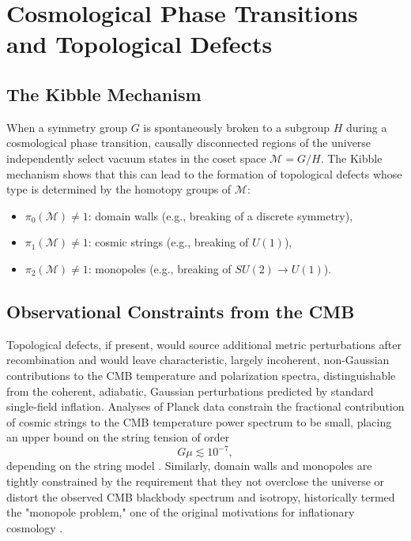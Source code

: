 \documentclass[11pt]{article}
\begin{document}
\section{Cosmological Phase Transitions and Topological Defects}

\subsection{The Kibble Mechanism}

When a symmetry group $G$ is spontaneously broken to a subgroup $H$ during a cosmological phase transition, causally disconnected regions of the universe independently select vacuum states in the coset space $\mathcal{M} = G/H$. The Kibble mechanism \citep{Kibble1976} shows that this can lead to the formation of topological defects whose type is determined by the homotopy groups of $\mathcal{M}$:
\begin{itemize}
\item $\pi_0(\mathcal{M}) \neq 1$: domain walls (e.g., breaking of a discrete symmetry),
\item $\pi_1(\mathcal{M}) \neq 1$: cosmic strings (e.g., breaking of $U(1)$),
\item $\pi_2(\mathcal{M}) \neq 1$: monopoles (e.g., breaking of $SU(2) \to U(1)$).
\end{itemize}

\subsection{Observational Constraints from the CMB}

Topological defects, if present, would source additional metric perturbations after recombination and would leave characteristic, largely incoherent, non-Gaussian contributions to the CMB temperature and polarization spectra, distinguishable from the coherent, adiabatic, Gaussian perturbations predicted by standard single-field inflation. Analyses of Planck data constrain the fractional contribution of cosmic strings to the CMB temperature power spectrum to be small, placing an upper bound on the string tension of order
\begin{equation}
G\mu \lesssim 10^{-7},
\end{equation}
depending on the string model \citep{Planck2013Strings}. Similarly, domain walls and monopoles are tightly constrained by the requirement that they not overclose the universe or distort the observed CMB blackbody spectrum and isotropy, historically termed the "monopole problem," one of the original motivations for inflationary cosmology \citep{Guth1981}.
\end{document}
